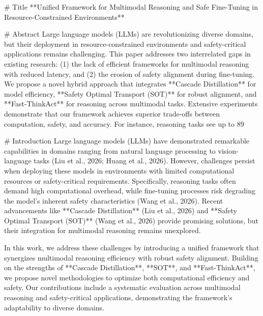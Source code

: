 # Title  
**Unified Framework for Multimodal Reasoning and Safe Fine-Tuning in Resource-Constrained Environments**

# Abstract  
Large language models (LLMs) are revolutionizing diverse domains, but their deployment in resource-constrained environments and safety-critical applications remains challenging. This paper addresses two interrelated gaps in existing research: (1) the lack of efficient frameworks for multimodal reasoning with reduced latency, and (2) the erosion of safety alignment during fine-tuning. We propose a novel hybrid approach that integrates **Cascade Distillation** for model efficiency, **Safety Optimal Transport (SOT)** for robust alignment, and **Fast-ThinkAct** for reasoning across multimodal tasks. Extensive experiments demonstrate that our framework achieves superior trade-offs between computation, safety, and accuracy. For instance, reasoning tasks see up to 89%

# Introduction  
Large language models (LLMs) have demonstrated remarkable capabilities in domains ranging from natural language processing to vision-language tasks (Liu et al., 2026; Huang et al., 2026). However, challenges persist when deploying these models in environments with limited computational resources or safety-critical requirements. Specifically, reasoning tasks often demand high computational overhead, while fine-tuning processes risk degrading the model's inherent safety characteristics (Wang et al., 2026). Recent advancements like **Cascade Distillation** (Liu et al., 2026) and **Safety Optimal Transport (SOT)** (Wang et al., 2026) provide promising solutions, but their integration for multimodal reasoning remains unexplored.

In this work, we address these challenges by introducing a unified framework that synergizes multimodal reasoning efficiency with robust safety alignment. Building on the strengths of **Cascade Distillation**, **SOT**, and **Fast-ThinkAct**, we propose novel methodologies to optimize both computational efficiency and safety. Our contributions include a systematic evaluation across multimodal reasoning and safety-critical applications, demonstrating the framework's adaptability to diverse domains.

